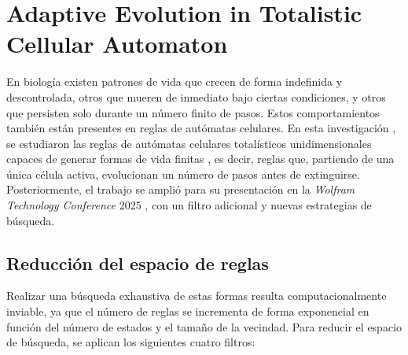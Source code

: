 \section{Adaptive Evolution in Totalistic Cellular Automaton}
\label{sec:evolucion-adaptativa}

En biología existen patrones de vida que crecen de forma indefinida y descontrolada, otros que mueren de inmediato bajo ciertas condiciones, y otros que persisten solo durante un número finito de pasos. Estos comportamientos también están presentes en reglas de autómatas celulares. En esta investigación \cite{angeles2025adaptive}, se estudiaron las reglas de autómatas celulares totalísticos unidimensionales capaces de generar formas de vida finitas \cite{hurtado2024finite}, es decir, reglas que, partiendo de una única célula activa, evolucionan un número de pasos antes de extinguirse. Posteriormente, el trabajo se amplió para su presentación en la \textit{Wolfram Technology Conference} 2025 \cite{angeles2025wtc}, con un filtro adicional y nuevas estrategias de búsqueda.

\subsection{Reducción del espacio de reglas}

Realizar una búsqueda exhaustiva de estas formas resulta computacionalmente inviable, ya que el número de reglas se incrementa de forma exponencial en función del número de estados y el tamaño de la vecindad. Para reducir el espacio de búsqueda, se aplican los siguientes cuatro filtros:

